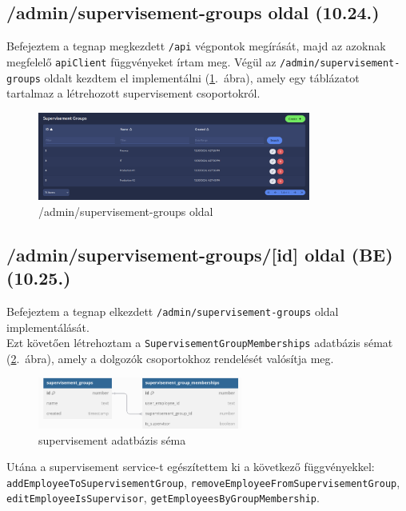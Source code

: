 \documentclass[a4paper]{article}
\newcommand{\inltxt}[1]{\texttt{#1}}
\begin{document}
\subsection{/admin/supervisement-groups oldal (10.24.)}

Befejeztem a tegnap megkezdett \inltxt{/api} végpontok megírását, majd az azoknak megfelelő \inltxt{apiClient}
függvényeket írtam meg. Végül az \inltxt{/admin/supervisement-groups} oldalt kezdtem el
implementálni (\ref{fig:sup_groups}.~ábra), amely egy táblázatot tartalmaz a létrehozott supervisement csoportokról.

\begin{figure}[ht]
  \centering
  \includegraphics[width = 0.8\textwidth]{images/sup_groups.png}
  \caption{/admin/supervisement-groups oldal}
  \label{fig:sup_groups}
\end{figure}

\subsection{/admin/supervisement-groups/[id] oldal (BE) (10.25.)}

Befejeztem a tegnap elkezdett \inltxt{/admin/supervisement-groups} oldal implementálását. \\

Ezt követően létrehoztam a \inltxt{SupervisementGroupMemberships} adatbázis sémat (\ref{fig:sup_schema}.~ábra), amely a
dolgozók csoportokhoz rendelését valósítja meg.

\begin{figure}[ht]
  \centering
  \includegraphics[width = 0.6\textwidth]{images/sm2.png}
  \caption{supervisement adatbázis séma}
  \label{fig:sup_schema}
\end{figure}

Utána a supervisement service-t egészítettem ki a következő függvényekkel:
\inltxt{addEmployeeToSupervisementGroup}, \inltxt{removeEmployeeFromSupervisementGroup},
\inltxt{editEmployeeIsSupervisor}, \inltxt{getEmployeesByGroupMembership}.\\
\end{document}
